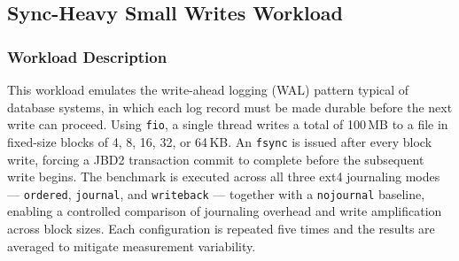 \documentclass[12pt,a4paper]{article}
\begin{document}
\subsection{Sync-Heavy Small Writes Workload}
\subsubsection{Workload Description}
This workload emulates the write-ahead logging (WAL) pattern typical of database
systems, in which each log record must be made durable before the next write can
proceed. Using \texttt{fio}, a single thread writes a total of 100\,MB to a file in
fixed-size blocks of 4, 8, 16, 32, or 64\,KB. An \texttt{fsync} is issued after every
block write, forcing a JBD2 transaction commit to complete before the subsequent write
begins. The benchmark is executed across all three ext4 journaling modes ---
\texttt{ordered}, \texttt{journal}, and \texttt{writeback} --- together with a
\texttt{nojournal} baseline, enabling a controlled comparison of journaling overhead
and write amplification across block sizes. Each configuration is repeated five times
and the results are averaged to mitigate measurement variability.
\end{document}
